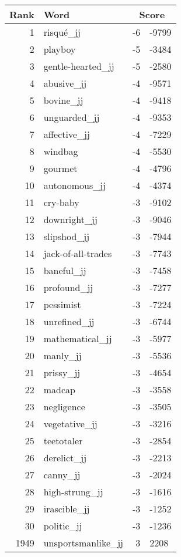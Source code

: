 \begin{longtable}[!htbp]{| rlr@{.}l |}
    \hline
    \textbf{Rank} & \textbf{Word} & \multicolumn{2}{c|}{\textbf{Score}} \\
    \hline
    \endhead
    1 & risqué\_jj & -6 & -9799 \\
    2 & playboy & -5 & -3484 \\
    3 & gentle-hearted\_jj & -5 & -2580 \\
    4 & abusive\_jj & -4 & -9571 \\
    5 & bovine\_jj & -4 & -9418 \\
    6 & unguarded\_jj & -4 & -9353 \\
    7 & affective\_jj & -4 & -7229 \\
    8 & windbag & -4 & -5530 \\
    9 & gourmet & -4 & -4796 \\
    10 & autonomous\_jj & -4 & -4374 \\
    11 & cry-baby & -3 & -9102 \\
    12 & downright\_jj & -3 & -9046 \\
    13 & slipshod\_jj & -3 & -7944 \\
    14 & jack-of-all-trades & -3 & -7743 \\
    15 & baneful\_jj & -3 & -7458 \\
    16 & profound\_jj & -3 & -7277 \\
    17 & pessimist & -3 & -7224 \\
    18 & unrefined\_jj & -3 & -6744 \\
    19 & mathematical\_jj & -3 & -5977 \\
    20 & manly\_jj & -3 & -5536 \\
    21 & prissy\_jj & -3 & -4654 \\
    22 & madcap & -3 & -3558 \\
    23 & negligence & -3 & -3505 \\
    24 & vegetative\_jj & -3 & -3216 \\
    25 & teetotaler & -3 & -2854 \\
    26 & derelict\_jj & -3 & -2213 \\
    27 & canny\_jj & -3 & -2024 \\
    28 & high-strung\_jj & -3 & -1616 \\
    29 & irascible\_jj & -3 & -1252 \\
    30 & politic\_jj & -3 & -1236 \\
    1949 & unsportsmanlike\_jj & 3 & 2208 \\

\end{longtable}
